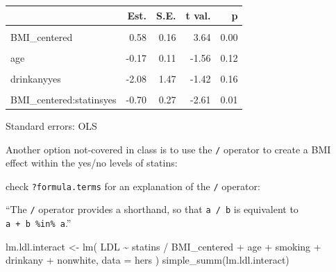 \documentclass[
  letterpaper,
  DIV=11,
  numbers=noendperiod]{scrreport}
\newenvironment{Shaded}{\begin{snugshade}}{\end{snugshade}}
\newcommand{\AttributeTok}[1]{\textcolor[rgb]{0.40,0.45,0.13}{#1}}
\newcommand{\FunctionTok}[1]{\textcolor[rgb]{0.28,0.35,0.67}{#1}}
\newcommand{\NormalTok}[1]{\textcolor[rgb]{0.00,0.23,0.31}{#1}}
\newcommand{\OtherTok}[1]{\textcolor[rgb]{0.00,0.23,0.31}{#1}}
\newcommand{\SpecialCharTok}[1]{\textcolor[rgb]{0.37,0.37,0.37}{#1}}
\begin{document}
\begin{table}[!h]
\centering
\begin{threeparttable}
\begin{tabular}{lrrrr}
\toprule
  & Est. & S.E. & t val. & p\\
\midrule
\cellcolor{gray!6}{(Intercept)} & \cellcolor{gray!6}{162.41} & \cellcolor{gray!6}{7.58} & \cellcolor{gray!6}{21.42} & \cellcolor{gray!6}{0.00}\\
BMI\_centered & 0.58 & 0.16 & 3.64 & 0.00\\
\cellcolor{gray!6}{statinsyes} & \cellcolor{gray!6}{-16.25} & \cellcolor{gray!6}{1.47} & \cellcolor{gray!6}{-11.07} & \cellcolor{gray!6}{0.00}\\
age & -0.17 & 0.11 & -1.56 & 0.12\\
\cellcolor{gray!6}{smokingyes} & \cellcolor{gray!6}{3.11} & \cellcolor{gray!6}{2.17} & \cellcolor{gray!6}{1.44} & \cellcolor{gray!6}{0.15}\\
\addlinespace
drinkanyyes & -2.08 & 1.47 & -1.42 & 0.16\\
\cellcolor{gray!6}{nonwhiteyes} & \cellcolor{gray!6}{4.07} & \cellcolor{gray!6}{2.28} & \cellcolor{gray!6}{1.79} & \cellcolor{gray!6}{0.07}\\
BMI\_centered:statinsyes & -0.70 & 0.27 & -2.61 & 0.01\\
\bottomrule
\end{tabular}
\begin{tablenotes}
\item Standard errors: OLS
\end{tablenotes}
\end{threeparttable}
\end{table}

Another option not-covered in class is to use the \texttt{/} operator to
create a BMI effect within the yes/no levels of statins:

check \texttt{?formula.terms} for an explanation of the \texttt{/}
operator:

``The \texttt{/} operator provides a shorthand, so that \texttt{a\ /\ b}
is equivalent to \texttt{a\ +\ b\ \%in\%\ a}.''

\begin{Shaded}
\begin{Highlighting}[]
\NormalTok{lm.ldl.interact }\OtherTok{\textless{}{-}} \FunctionTok{lm}\NormalTok{(}
\NormalTok{  LDL }\SpecialCharTok{\textasciitilde{}}\NormalTok{ statins }\SpecialCharTok{/}\NormalTok{ BMI\_centered }\SpecialCharTok{+} 
\NormalTok{    age }\SpecialCharTok{+}\NormalTok{ smoking }\SpecialCharTok{+}\NormalTok{ drinkany }\SpecialCharTok{+}\NormalTok{ nonwhite,}
  \AttributeTok{data =}\NormalTok{ hers}
\NormalTok{)}
\FunctionTok{simple\_summ}\NormalTok{(lm.ldl.interact)}
\end{Highlighting}
\end{Shaded}
\end{document}
